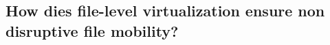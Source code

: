 \subsection{How dies file-level virtualization ensure non disruptive file mobility?} %
\label{sub:how_dies_file_leve_virtualization_ensure_nondisruptive_file_mobility}


